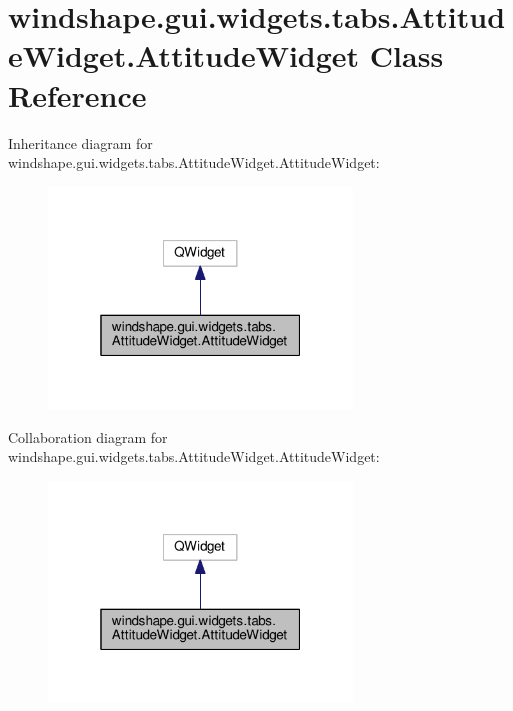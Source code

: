 \hypertarget{classwindshape_1_1gui_1_1widgets_1_1tabs_1_1_attitude_widget_1_1_attitude_widget}{}\section{windshape.\+gui.\+widgets.\+tabs.\+Attitude\+Widget.\+Attitude\+Widget Class Reference}
\label{classwindshape_1_1gui_1_1widgets_1_1tabs_1_1_attitude_widget_1_1_attitude_widget}


Inheritance diagram for windshape.\+gui.\+widgets.\+tabs.\+Attitude\+Widget.\+Attitude\+Widget\+:\nopagebreak
\begin{figure}[H]
\begin{center}
\leavevmode
\includegraphics[width=229pt]{classwindshape_1_1gui_1_1widgets_1_1tabs_1_1_attitude_widget_1_1_attitude_widget__inherit__graph}
\end{center}
\end{figure}


Collaboration diagram for windshape.\+gui.\+widgets.\+tabs.\+Attitude\+Widget.\+Attitude\+Widget\+:\nopagebreak
\begin{figure}[H]
\begin{center}
\leavevmode
\includegraphics[width=229pt]{classwindshape_1_1gui_1_1widgets_1_1tabs_1_1_attitude_widget_1_1_attitude_widget__coll__graph}
\end{center}
\end{figure}
